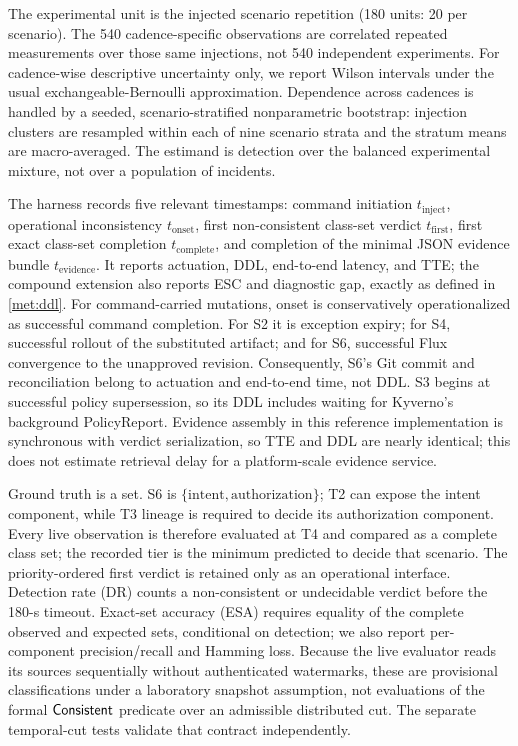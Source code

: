 The experimental unit is the injected scenario repetition (180 units: 20 per
scenario). The 540 cadence-specific observations are correlated repeated
measurements over those same injections, not 540 independent experiments.
For cadence-wise descriptive uncertainty only, we report Wilson intervals
under the usual exchangeable-Bernoulli approximation. Dependence across
cadences is handled by a seeded, scenario-stratified nonparametric bootstrap:
injection clusters are resampled
within each of nine scenario strata and the stratum means are macro-averaged.
The estimand is detection over the balanced experimental mixture, not over a
population of incidents.

The harness records five relevant timestamps: command initiation
$t_{\mathrm{inject}}$, operational inconsistency
$t_{\mathrm{onset}}$, first non-consistent class-set verdict
$t_{\mathrm{first}}$, first exact class-set completion $t_{\mathrm{complete}}$, and
completion of the minimal JSON evidence bundle
$t_{\mathrm{evidence}}$. It reports actuation, DDL, end-to-end latency, and
TTE; the compound extension also reports ESC and diagnostic gap, exactly as
defined in \cref{met:ddl}. For command-carried mutations,
onset is conservatively operationalized as successful command completion.
For S2 it is exception expiry; for S4, successful rollout of the substituted
artifact; and for S6, successful Flux convergence to the unapproved revision.
Consequently, S6's Git commit and reconciliation belong to actuation and
end-to-end time, not DDL. S3 begins at successful policy supersession, so its
DDL includes waiting for Kyverno's background PolicyReport. Evidence
assembly in this reference implementation is synchronous with verdict
serialization, so TTE and DDL are nearly identical; this does not estimate
retrieval delay for a platform-scale evidence service.

Ground truth is a set. S6 is $\{\text{intent},\text{authorization}\}$; T2
can expose the intent component, while T3 lineage is required to decide its
authorization component. Every live observation is therefore evaluated at
T4 and compared as a complete class set; the recorded tier is the minimum predicted
to decide that scenario. The priority-ordered first verdict is retained only
as an operational interface. Detection rate (DR) counts a non-consistent or
undecidable verdict before the 180-s timeout. Exact-set accuracy (ESA) requires
equality of the complete observed and expected sets, conditional on detection;
we also report per-component precision/recall and Hamming loss. Because the
live evaluator reads its sources sequentially without authenticated watermarks,
these are provisional classifications under a laboratory snapshot assumption,
not evaluations of the formal $\mathsf{Consistent}$ predicate over an admissible distributed
cut. The separate temporal-cut tests validate that contract independently.

